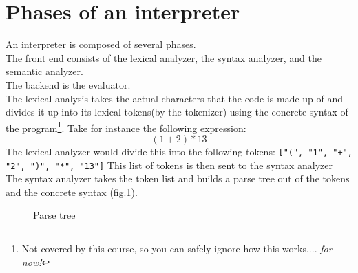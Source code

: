 \section{Phases of an interpreter}
An interpreter is composed of several phases. \\
The front end consists of the lexical analyzer, the syntax analyzer, and the semantic analyzer.\\
The backend is the evaluator.\\
The \gls{lexical analysis} takes the actual characters that the code is made up of and divides it up into its lexical tokens(by the tokenizer) using the concrete syntax of the program\footnote{Not covered by this course, so you can safely ignore how this works.... \textit{for now!}}. 
Take for instance the following expression:
\begin{equation*}
    (1+2)*13
\end{equation*}
The lexical analyzer would divide this into the following tokens:
\texttt{["(", "1", "+", "2", ")", "*", "13"]}
This list of tokens is then sent to the \gls{syntax analyzer}\\
The syntax analyzer takes the token list and builds a parse tree out of the tokens and the concrete syntax (fig.\ref{fig:parsetree}).
\begin{figure}[!h]
    \centering
    \begin{minipage}{.6\textwidth}
    \end{minipage}
    \caption{Parse tree}
    \label{fig:parsetree}
\end{figure}

